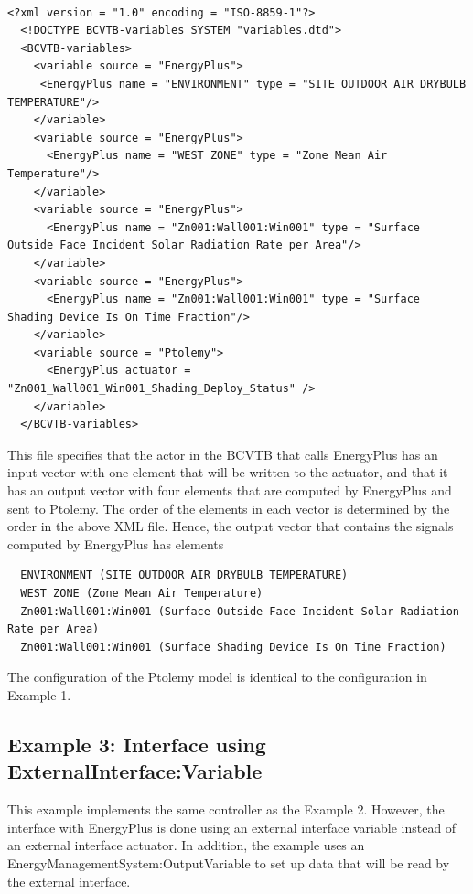 \begin{lstlisting}

<?xml version = "1.0" encoding = "ISO-8859-1"?>
  <!DOCTYPE BCVTB-variables SYSTEM "variables.dtd">
  <BCVTB-variables>
    <variable source = "EnergyPlus">
     <EnergyPlus name = "ENVIRONMENT" type = "SITE OUTDOOR AIR DRYBULB TEMPERATURE"/>
    </variable>
    <variable source = "EnergyPlus">
      <EnergyPlus name = "WEST ZONE" type = "Zone Mean Air Temperature"/>
    </variable>
    <variable source = "EnergyPlus">
      <EnergyPlus name = "Zn001:Wall001:Win001" type = "Surface Outside Face Incident Solar Radiation Rate per Area"/>
    </variable>
    <variable source = "EnergyPlus">
      <EnergyPlus name = "Zn001:Wall001:Win001" type = "Surface Shading Device Is On Time Fraction"/>
    </variable>
    <variable source = "Ptolemy">
      <EnergyPlus actuator = "Zn001_Wall001_Win001_Shading_Deploy_Status" />
    </variable>
  </BCVTB-variables>
\end{lstlisting}

This file specifies that the actor in the BCVTB that calls EnergyPlus has an input vector with one element that will be written to the actuator, and that it has an output vector with four elements that are computed by EnergyPlus and sent to Ptolemy. The order of the elements in each vector is determined by the order in the above XML file. Hence, the output vector that contains the signals computed by EnergyPlus has elements

\begin{lstlisting}
  ENVIRONMENT (SITE OUTDOOR AIR DRYBULB TEMPERATURE)
  WEST ZONE (Zone Mean Air Temperature)
  Zn001:Wall001:Win001 (Surface Outside Face Incident Solar Radiation Rate per Area)
  Zn001:Wall001:Win001 (Surface Shading Device Is On Time Fraction)
\end{lstlisting}

The configuration of the Ptolemy model is identical to the configuration in Example 1.

\subsection{Example 3: Interface using ExternalInterface:Variable}\label{example-3-interface-using-externalinterfacevariable}

This example implements the same controller as the Example 2. However, the interface with EnergyPlus is done using an external interface variable instead of an external interface actuator. In addition, the example uses an EnergyManagementSystem:OutputVariable to set up data that will be read by the external interface.

